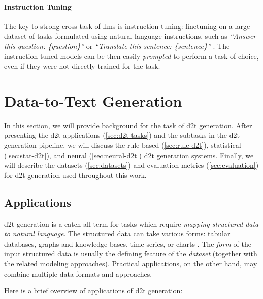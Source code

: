 \paragraph{Instruction Tuning} The key to strong cross-task of \acp{llm} is instruction tuning: finetuning on a large dataset of tasks formulated using natural language instructions, such as \textit{``Answer this question: \{question\}''} or \textit{``Translate this sentence: \{sentence\}''} \cite{sanh2021multitask,ouyang2022training}. The instruction-tuned models can be then easily \emph{prompted} to perform a task of choice, even if   they were not directly trained for the task.



\section{Data-to-Text Generation}
\label{sec:d2t}
In this section, we will provide background for the task of \ac{d2t} generation. After presenting the \ac{d2t} applications (\autoref{sec:d2t-tasks}) and the subtasks in the \ac{d2t} generation pipeline, we will discuss the rule-based (\autoref{sec:rule-d2t}), statistical (\autoref{sec:stat-d2t}), and neural (\autoref{sec:neural-d2t}) \ac{d2t} generation systems. Finally, we will describe the datasets (\autoref{sec:datasets}) and evaluation metrics (\autoref{sec:evaluation}) for \ac{d2t} generation used throughout this work.

\subsection{Applications}
\label{sec:d2t-tasks}

\ac{d2t} generation is a catch-all term for tasks which require \emph{mapping structured data to natural language}. The structured data can take various forms: tabular databases, graphs and knowledge bases, time-series, or charts \cite{gattSurveyStateArt2018,sharmaInnovationsNeuralDatatotext2022}. The \emph{form} of the input structured data is usually the defining feature of the \emph{dataset} (together with the related modeling approaches). Practical applications, on the other hand, may combine multiple data formats and approaches.

Here is a brief overview of applications of \ac{d2t} generation:

